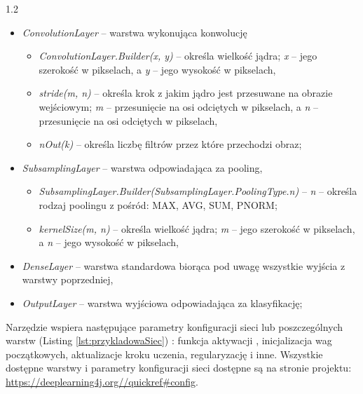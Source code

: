 \documentclass[a4paper,12pt]{article}
\newcommand\spacingInSolemnItemize{1.2}
\newcommand\spacingVspace{0.7em}
\begin{document}
			\begin{spacing}{\spacingInSolemnItemize}
				\begin{itemize}
					\item \textit{ConvolutionLayer} -- warstwa wykonująca konwolucję
						\begin{itemize}
							\item \textit{ConvolutionLayer.Builder(x, y)} -- określa wielkość jądra; \textit{x} -- jego szerokość w pikselach, a \textit{y} -- jego wysokość w pikselach,
							\item \textit{stride(m, n)} -- określa krok z jakim jądro jest przesuwane na obrazie wejściowym; \textit{m} -- przesunięcie na osi odciętych w pikselach, 
								a \textit{n} -- przesunięcie na osi odciętych w pikselach,
							\item \textit{nOut(k)} -- określa liczbę filtrów przez które przechodzi obraz;
						\end{itemize}
					\item \textit{SubsamplingLayer} -- warstwa odpowiadająca za pooling,
						\begin{itemize}
							\item \textit{SubsamplingLayer.Builder(SubsamplingLayer.PoolingType.n)} -- \textit{n} -- określa rodzaj poolingu z pośród: MAX, AVG, SUM, PNORM; 
							\item \textit{kernelSize(m, n)} -- określa wielkość jądra; \textit{m} -- jego szerokość w pikselach, a \textit{n} -- jego wysokość w pikselach,
						\end{itemize}
					\item \textit{DenseLayer} -- warstwa standardowa biorąca pod uwagę wszystkie wyjścia z warstwy poprzedniej,
					\item \textit{OutputLayer} -- warstwa wyjściowa odpowiadająca za klasyfikację;
				\end{itemize}
			\end{spacing}
			\vspace{\spacingVspace}
		 Narzędzie wspiera następujące parametry konfiguracji sieci lub poszczególnych warstw (Listing \ref{lst:przykladowaSiec}) : funkcja aktywacji , inicjalizacja wag początkowych, 
			aktualizacje kroku uczenia, regularyzację i inne. Wszystkie dostępne warstwy i parametry konfiguracji sieci dostępne są na stronie projektu:
			\href{https://deeplearning4j.org//quickref\#config}{\url{https://deeplearning4j.org//quickref\#config}}.
			\newline
            
		
\end{document}
